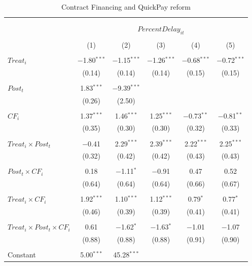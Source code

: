 \documentclass[
]{article}
\begin{document}
\begin{table}[H] \centering 
  \caption{Contract Financing and QuickPay reform} 
  \label{} 
\small 
\begin{tabular}{@{\extracolsep{-2pt}}lccccc} 
\\[-1.8ex]\hline 
\hline \\[-1.8ex] 
\\[-1.8ex] & \multicolumn{5}{c}{$PercentDelay_{it}$  } \\ 
\\[-1.8ex] & (1) & (2) & (3) & (4) & (5)\\ 
\hline \\[-1.8ex] 
 $Treat_i$ & $-$1.80$^{***}$ & $-$1.15$^{***}$ & $-$1.26$^{***}$ & $-$0.68$^{***}$ & $-$0.72$^{***}$ \\ 
  & (0.14) & (0.14) & (0.14) & (0.15) & (0.15) \\ 
  & & & & & \\ 
 $Post_t$ & 1.83$^{***}$ & $-$9.39$^{***}$ &  &  &  \\ 
  & (0.26) & (2.50) &  &  &  \\ 
  & & & & & \\ 
 $CF_i$ & 1.37$^{***}$ & 1.46$^{***}$ & 1.25$^{***}$ & $-$0.73$^{**}$ & $-$0.81$^{**}$ \\ 
  & (0.35) & (0.30) & (0.30) & (0.32) & (0.33) \\ 
  & & & & & \\ 
 $Treat_i \times Post_t$ & $-$0.41 & 2.29$^{***}$ & 2.39$^{***}$ & 2.22$^{***}$ & 2.25$^{***}$ \\ 
  & (0.32) & (0.42) & (0.42) & (0.43) & (0.43) \\ 
  & & & & & \\ 
 $Post_t \times CF_i$ & 0.18 & $-$1.11$^{*}$ & $-$0.91 & 0.47 & 0.52 \\ 
  & (0.64) & (0.64) & (0.64) & (0.66) & (0.67) \\ 
  & & & & & \\ 
 $Treat_i \times CF_i$ & 1.92$^{***}$ & 1.10$^{***}$ & 1.12$^{***}$ & 0.79$^{*}$ & 0.77$^{*}$ \\ 
  & (0.46) & (0.39) & (0.39) & (0.41) & (0.41) \\ 
  & & & & & \\ 
 $Treat_i \times Post_t \times CF_i$ & 0.61 & $-$1.62$^{*}$ & $-$1.63$^{*}$ & $-$1.01 & $-$1.07 \\ 
  & (0.88) & (0.88) & (0.88) & (0.91) & (0.90) \\ 
  & & & & & \\ 
 Constant & 5.00$^{***}$ & 45.28$^{***}$ &  &  &  \\ 

\end{tabular}
\end{table}
\end{document}
